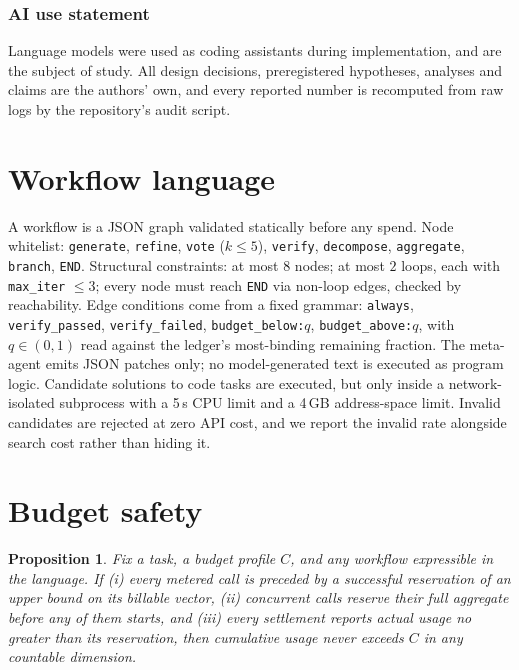 \documentclass{article}
\newtheorem{proposition}{Proposition}
\begin{document}
\subsubsection*{AI use statement}

Language models were used as coding assistants during implementation, and are the
subject of study. All design decisions, preregistered hypotheses, analyses and
claims are the authors' own, and every reported number is recomputed from raw
logs by the repository's audit script.




\appendix
\section{Workflow language}
\label{app:dsl}

A workflow is a JSON graph validated statically before any spend. Node
whitelist: \texttt{generate}, \texttt{refine}, \texttt{vote} ($k\le 5$),
\texttt{verify}, \texttt{decompose}, \texttt{aggregate}, \texttt{branch},
\texttt{END}. Structural constraints: at most $8$ nodes; at most $2$ loops, each
with \texttt{max\_iter} $\le 3$; every node must reach \texttt{END} via non-loop
edges, checked by reachability. Edge conditions come from a fixed grammar:
\texttt{always}, \texttt{verify\_passed}, \texttt{verify\_failed},
\texttt{budget\_below:$q$}, \texttt{budget\_above:$q$}, with $q\in(0,1)$ read
against the ledger's most-binding remaining fraction. The meta-agent emits JSON
patches only; no model-generated text is executed as program logic. Candidate
solutions to code tasks are executed, but only inside a network-isolated
subprocess with a 5\,s CPU limit and a 4\,GB address-space limit. Invalid
candidates are rejected at zero API cost, and we report the invalid rate
alongside search cost rather than hiding it.

\section{Budget safety}
\label{app:safety}

\begin{proposition}
Fix a task, a budget profile $C$, and any workflow expressible in the language.
If (i) every metered call is preceded by a successful reservation of an upper
bound on its billable vector, (ii) concurrent calls reserve their full aggregate
before any of them starts, and (iii) every settlement reports actual usage no
greater than its reservation, then cumulative usage never exceeds $C$ in any
countable dimension.
\end{proposition}
\end{document}
